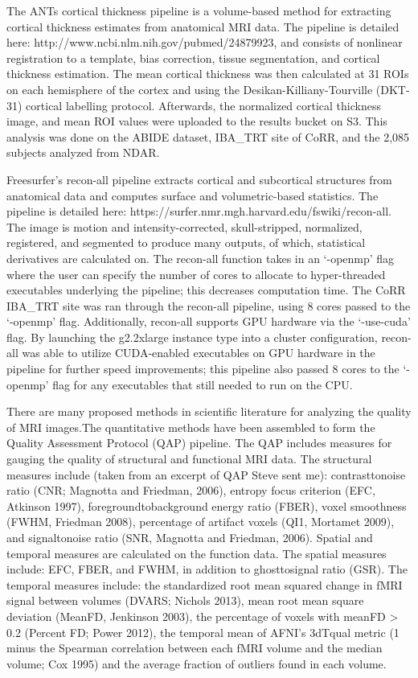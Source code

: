\documentclass{frontiersSCNS} %
\begin{document}
The ANTs cortical thickness pipeline is a volume-based method for extracting cortical thickness estimates from anatomical MRI data. The pipeline is detailed here: http://www.ncbi.nlm.nih.gov/pubmed/24879923, and consists of nonlinear registration to a template, bias correction, tissue segmentation, and cortical thickness estimation. The mean cortical thickness was then calculated at 31 ROIs on each hemisphere of the cortex and using the Desikan-Killiany-Tourville (DKT-31) cortical labelling protocol. Afterwards, the normalized cortical thickness image, and mean ROI values were uploaded to the results bucket on S3. This analysis was done on the ABIDE dataset, IBA\_TRT site of CoRR, and the 2,085 subjects analyzed from NDAR.


Freesurfer’s recon-all pipeline extracts cortical and subcortical structures from anatomical data and computes surface and volumetric-based statistics. The pipeline is detailed here: https://surfer.nmr.mgh.harvard.edu/fswiki/recon-all. The image is motion and intensity-corrected, skull-stripped, normalized, registered, and segmented to produce many outputs, of which, statistical derivatives are calculated on. The recon-all function takes in an ‘-openmp’ flag where the user can specify the number of cores to allocate to hyper-threaded executables underlying the pipeline; this decreases computation time. The CoRR IBA\_TRT site was ran through the recon-all pipeline, using 8 cores passed to the ‘-openmp’ flag. Additionally, recon-all supports GPU hardware via the ‘-use-cuda’ flag. By launching the g2.2xlarge instance type into a cluster configuration, recon-all was able to utilize CUDA-enabled executables on GPU hardware in the pipeline for further speed improvements; this pipeline also passed 8 cores to the ‘-openmp’ flag for any executables that still needed to run on the CPU.


There are many proposed methods in scientific literature for analyzing the quality of MRI images.The quantitative methods have been assembled to form the Quality Assessment Protocol (QAP) pipeline. The QAP includes measures for gauging the quality of structural and functional MRI data. The structural measures include (taken from an excerpt of QAP Steve sent me): contrast­to­noise ratio (CNR; Magnotta and Friedman, 2006), entropy focus criterion (EFC, Atkinson 1997), foreground­to­background energy ratio (FBER), voxel smoothness (FWHM, Friedman 2008), percentage of artifact voxels (QI1, Mortamet 2009), and signal­to­noise ratio (SNR, Magnotta and Friedman, 2006). Spatial and temporal measures are calculated on the function data. The spatial measures include: EFC, FBER, and FWHM, in addition to ghost­to­signal ratio (GSR). The temporal measures include: the standardized root mean squared change in fMRI signal between volumes (DVARS; Nichols 2013), mean root mean square deviation (MeanFD, Jenkinson 2003), the percentage of voxels with meanFD > 0.2 (Percent FD; Power 2012), the temporal mean of AFNI’s 3dTqual metric (1 minus the Spearman correlation between each fMRI volume and the median volume; Cox 1995) and the average fraction of outliers found in each volume.
\end{document}
